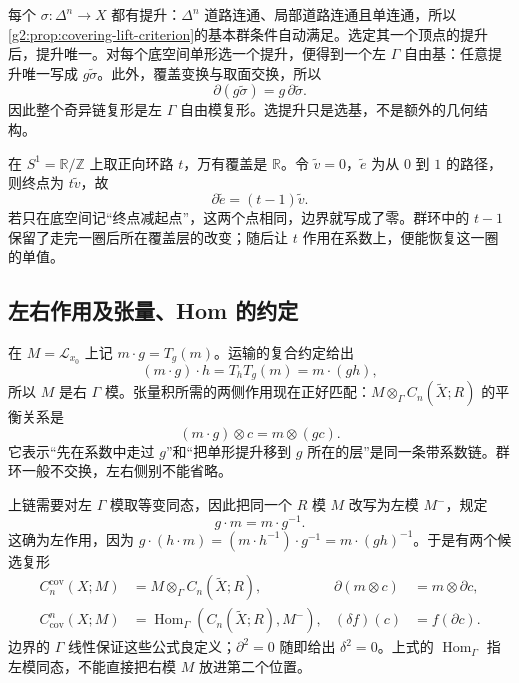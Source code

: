 每个 \(\sigma:\Delta^n\to X\) 都有提升：\(\Delta^n\) 道路连通、局部道路连通且单连通，所以\cref{g2:prop:covering-lift-criterion}的基本群条件自动满足。选定其一个顶点的提升后，提升唯一。对每个底空间单形选一个提升，便得到一个左 \(\Gamma\) 自由基：任意提升唯一写成 \(g\widetilde\sigma\)。此外，覆盖变换与取面交换，所以
\[
	\partial(g\widetilde\sigma)=g\,\partial\widetilde\sigma.
\]
因此整个奇异链复形是左 \(\Gamma\) 自由模复形。选提升只是选基，不是额外的几何结构。

\begin{example}\label{g2:exm:cover-circle-boundary}
	在 \(S^1=\mathbb R/\mathbb Z\) 上取正向环路 \(t\)，万有覆盖是 \(\mathbb R\)。令 \(\widetilde v=0\)，\(\widetilde e\) 为从 \(0\) 到 \(1\) 的路径，则终点为 \(t\widetilde v\)，故
	\[
		\partial\widetilde e=(t-1)\widetilde v.
	\]
	若只在底空间记“终点减起点”，这两个点相同，边界就写成了零。群环中的 \(t-1\) 保留了走完一圈后所在覆盖层的改变；随后让 \(t\) 作用在系数上，便能恢复这一圈的单值。
\end{example}

\subsection{左右作用及张量、Hom 的约定}
\label{g2:subsec:0502:02}
在 \(M=\mathcal L_{x_0}\) 上记 \(m\cdot g=T_g(m)\)。运输的复合约定给出
\[
	(m\cdot g)\cdot h=T_hT_g(m)=m\cdot(gh),
\]
所以 \(M\) 是右 \(\Gamma\) 模。张量积所需的两侧作用现在正好匹配：\(M\otimes_\Gamma C_n(\widetilde X;R)\) 的平衡关系是
\begin{equation}\label{g2:eq:twisted-tensor-balance}
	(m\cdot g)\otimes c=m\otimes(gc).
\end{equation}
它表示“先在系数中走过 \(g\)”和“把单形提升移到 \(g\) 所在的层”是同一条带系数链。群环一般不交换，左右侧别不能省略。

\ProseParagraphBreak

上链需要对左 \(\Gamma\) 模取等变同态，因此把同一个 \(R\) 模 \(M\) 改写为左模 \(M^-\)，规定
\[
	g\cdot m=m\cdot g^{-1}.
\]
这确为左作用，因为 \(g\cdot(h\cdot m)=(m\cdot h^{-1})\cdot g^{-1}=m\cdot(gh)^{-1}\)。于是有两个候选复形
\begin{equation}\label{g2:eq:twisted-cover-complexes}
	\begin{aligned}
		C_n^{\mathrm{cov}}(X;M)&=M\otimes_\Gamma C_n(\widetilde X;R),
		&\partial(m\otimes c)&=m\otimes\partial c,\\
		C^n_{\mathrm{cov}}(X;M)&=\operatorname{Hom}_\Gamma(C_n(\widetilde X;R),M^-),
		&(\delta f)(c)&=f(\partial c).
	\end{aligned}
\end{equation}
边界的 \(\Gamma\) 线性保证这些公式良定义；\(\partial^2=0\) 随即给出 \(\delta^2=0\)。上式的 \(\operatorname{Hom}_\Gamma\) 指左模同态，不能直接把右模 \(M\) 放进第二个位置。

